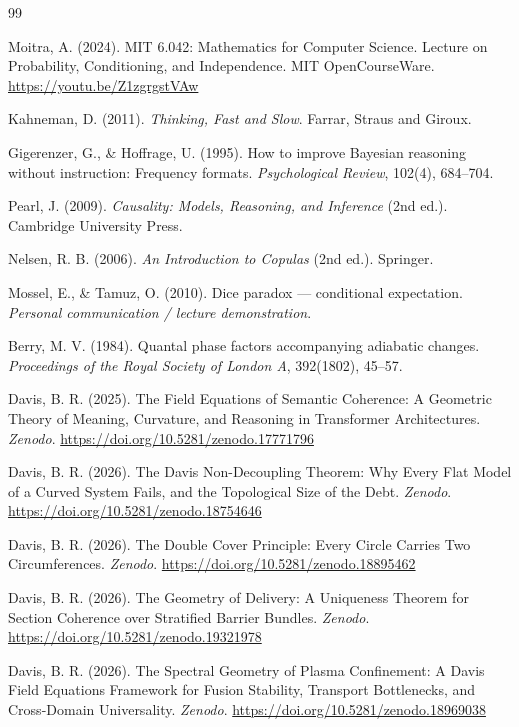 \documentclass[12pt]{article}
\begin{document}
\begin{thebibliography}{99}

Moitra, A. (2024). MIT 6.042: Mathematics for Computer Science. Lecture on Probability, Conditioning, and Independence. MIT OpenCourseWare. \url{https://youtu.be/Z1zgrgstVAw}

Kahneman, D. (2011). \textit{Thinking, Fast and Slow}. Farrar, Straus and Giroux.

Gigerenzer, G., \& Hoffrage, U. (1995). How to improve Bayesian reasoning without instruction: Frequency formats. \textit{Psychological Review}, 102(4), 684--704.

Pearl, J. (2009). \textit{Causality: Models, Reasoning, and Inference} (2nd ed.). Cambridge University Press.

Nelsen, R. B. (2006). \textit{An Introduction to Copulas} (2nd ed.). Springer.

Mossel, E., \& Tamuz, O. (2010). Dice paradox --- conditional expectation. \textit{Personal communication / lecture demonstration}.

Berry, M. V. (1984). Quantal phase factors accompanying adiabatic changes. \textit{Proceedings of the Royal Society of London A}, 392(1802), 45--57.

Davis, B. R. (2025). The Field Equations of Semantic Coherence: A Geometric Theory of Meaning, Curvature, and Reasoning in Transformer Architectures. \textit{Zenodo}. \url{https://doi.org/10.5281/zenodo.17771796}

Davis, B. R. (2026). The Davis Non-Decoupling Theorem: Why Every Flat Model of a Curved System Fails, and the Topological Size of the Debt. \textit{Zenodo}. \url{https://doi.org/10.5281/zenodo.18754646}

Davis, B. R. (2026). The Double Cover Principle: Every Circle Carries Two Circumferences. \textit{Zenodo}. \url{https://doi.org/10.5281/zenodo.18895462}

Davis, B. R. (2026). The Geometry of Delivery: A Uniqueness Theorem for Section Coherence over Stratified Barrier Bundles. \textit{Zenodo}. \url{https://doi.org/10.5281/zenodo.19321978}

Davis, B. R. (2026). The Spectral Geometry of Plasma Confinement: A Davis Field Equations Framework for Fusion Stability, Transport Bottlenecks, and Cross-Domain Universality. \textit{Zenodo}. \url{https://doi.org/10.5281/zenodo.18969038}


\end{thebibliography}
\end{document}
